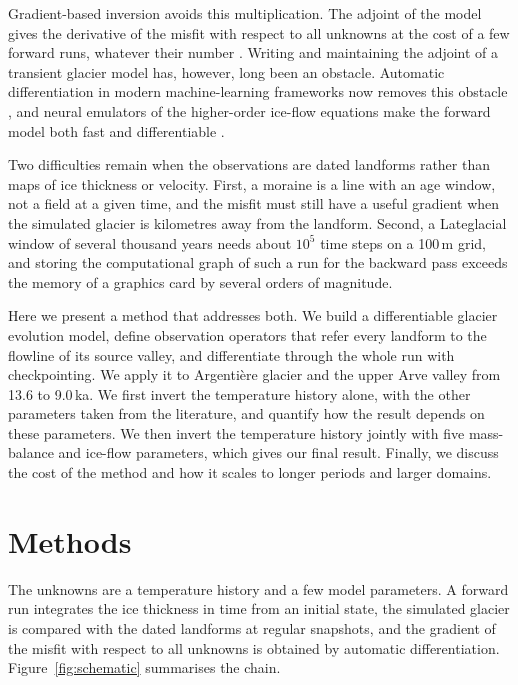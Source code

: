 \documentclass[tc, manuscript]{copernicus}
\begin{document}
Gradient-based inversion avoids this multiplication. The adjoint of the model gives the derivative of the misfit with respect to all unknowns at the cost of a few forward runs, whatever their number \citep{macayeal1993,heimbach2009,gilletchaulet2012,goldberg2013,larour2014,mosbeux2016}. Writing and maintaining the adjoint of a transient glacier model has, however, long been an obstacle. Automatic differentiation in modern machine-learning frameworks now removes this obstacle \citep{baydin2018,paszke2019}, and neural emulators of the higher-order ice-flow equations make the forward model both fast and differentiable \citep{jouvet2022,jouvet2023inv,jouvet2023pinn,bolibar2023}.

Two difficulties remain when the observations are dated landforms rather than maps of ice thickness or velocity. First, a moraine is a line with an age window, not a field at a given time, and the misfit must still have a useful gradient when the simulated glacier is kilometres away from the landform. Second, a Lateglacial window of several thousand years needs about $10^5$ time steps on a 100\,m grid, and storing the computational graph of such a run for the backward pass exceeds the memory of a graphics card by several orders of magnitude.

Here we present a method that addresses both. We build a differentiable glacier evolution model, define observation operators that refer every landform to the flowline of its source valley, and differentiate through the whole run with checkpointing. We apply it to Argenti\`ere glacier and the upper Arve valley from 13.6 to 9.0\,ka. We first invert the temperature history alone, with the other parameters taken from the literature, and quantify how the result depends on these parameters. We then invert the temperature history jointly with five mass-balance and ice-flow parameters, which gives our final result. Finally, we discuss the cost of the method and how it scales to longer periods and larger domains.


\section{Methods}
\label{sec:methods}

The unknowns are a temperature history and a few model parameters. A forward run integrates the ice thickness in time from an initial state, the simulated glacier is compared with the dated landforms at regular snapshots, and the gradient of the misfit with respect to all unknowns is obtained by automatic differentiation. Figure~\ref{fig:schematic} summarises the chain.
\end{document}
